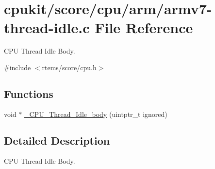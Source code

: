 \hypertarget{armv7-thread-idle_8c}{}\section{cpukit/score/cpu/arm/armv7-\/thread-\/idle.c File Reference}
\label{armv7-thread-idle_8c}


C\+PU Thread Idle Body.  


{\ttfamily \#include $<$rtems/score/cpu.\+h$>$}\newline
\subsection*{Functions}
\begin{DoxyCompactItemize}
\item 
void $\ast$ \mbox{\hyperlink{group__RTEMSScoreCPUARM_ga903a802003c95d6ef5206cb330424a1b}{\+\_\+\+C\+P\+U\+\_\+\+Thread\+\_\+\+Idle\+\_\+body}} (uintptr\+\_\+t ignored)
\end{DoxyCompactItemize}


\subsection{Detailed Description}
C\+PU Thread Idle Body. 

